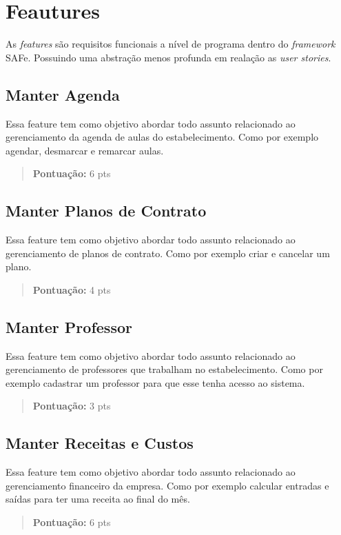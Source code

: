 \section[Features]{Feautures}
As \textsl{features} são requisitos funcionais a nível de programa dentro do
\textsl{framework} SAFe. Possuindo uma abstração menos profunda em realação as
\textsl{user stories}.

\subsection[Manter Agenda]{Manter Agenda}
Essa feature tem como objetivo abordar todo assunto relacionado ao gerenciamento
da agenda de aulas do estabelecimento. Como por exemplo agendar, desmarcar e
remarcar aulas.
\begin{quote}
    \textbf{Pontuação:} 6 pts
\end{quote}

\subsection[Manter Planos de Contrato]{Manter Planos de Contrato}
Essa feature tem como objetivo abordar todo assunto relacionado ao gerenciamento
de planos de contrato. Como por exemplo criar e cancelar um plano.
\begin{quote}
    \textbf{Pontuação:} 4 pts
\end{quote}

\subsection[Manter Professor]{Manter Professor}
Essa feature tem como objetivo abordar todo assunto relacionado ao gerenciamento
de professores que trabalham no estabelecimento. Como por exemplo cadastrar
um professor para que esse tenha acesso ao sistema.
\begin{quote}
    \textbf{Pontuação:} 3 pts
\end{quote}

\subsection[Manter Receitas e Custos]{Manter Receitas e Custos}
Essa feature tem como objetivo abordar todo assunto relacionado ao gerenciamento
financeiro da empresa. Como por exemplo calcular entradas e saídas para ter uma
receita ao final do mês.
\begin{quote}
    \textbf{Pontuação:} 6 pts
\end{quote}

